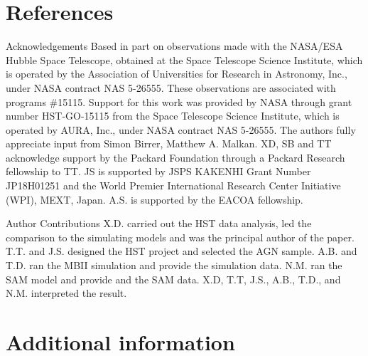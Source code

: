 \documentclass{natureprintstyle}
\newcommand{\lenstronomy}{{\sc Lenstronomy}}
\begin{document}

\section*{References}
 


\begin{addendum}
 \item[Acknowledgements] 
Based in part on observations made with the NASA/ESA Hubble Space Telescope, obtained at the Space Telescope Science Institute, which is operated by the Association of Universities for Research in Astronomy, Inc., under NASA contract NAS 5-26555. These observations are associated with programs \#15115. Support for this work was provided by NASA through grant number HST-GO-15115 from the Space Telescope Science Institute, which is operated by AURA, Inc., under NASA contract NAS 5-26555. The authors fully appreciate input from Simon Birrer, Matthew A. Malkan. XD, SB and TT acknowledge support by the Packard Foundation through a Packard Research fellowship to TT. JS is supported by JSPS KAKENHI Grant Number JP18H01251 and the World Premier International Research Center Initiative (WPI), MEXT, Japan. A.S. is supported by the EACOA fellowship.

%
\item[Author Contributions] X.D. carried out the HST data analysis, led the comparison to the simulating models and was the principal author of the paper. T.T. and J.S. designed the HST project and selected the AGN sample. A.B. and T.D. ran the MBII simulation and provide the simulation data. N.M. ran the SAM model and provide and the SAM data. X.D, T.T, J.S., A.B., T.D., and N.M. interpreted the result.

\end{addendum}

\section*{Additional information}
\end{document}
